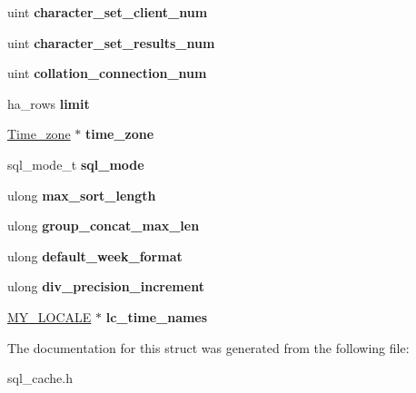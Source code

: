 \begin{DoxyCompactItemize}
uint {\bfseries character\+\_\+set\+\_\+client\+\_\+num}
\item 
\mbox{\label{structQuery__cache__query__flags_ab671ce68c180eccbe8e835b27793b6a7}} 
uint {\bfseries character\+\_\+set\+\_\+results\+\_\+num}
\item 
\mbox{\label{structQuery__cache__query__flags_a58ee0e73edc0ec68bd747c039bace83c}} 
uint {\bfseries collation\+\_\+connection\+\_\+num}
\item 
\mbox{\label{structQuery__cache__query__flags_a78aa1e3816d2ab3007bbca40bfe2ab32}} 
ha\+\_\+rows {\bfseries limit}
\item 
\mbox{\label{structQuery__cache__query__flags_ac22e3829a937200a9dec851df600ebe4}} 
\mbox{\hyperlink{classTime__zone}{Time\+\_\+zone}} $\ast$ {\bfseries time\+\_\+zone}
\item 
\mbox{\label{structQuery__cache__query__flags_ad0cf5de25b925a8674c63024fab42f58}} 
sql\+\_\+mode\+\_\+t {\bfseries sql\+\_\+mode}
\item 
\mbox{\label{structQuery__cache__query__flags_a2a4472b412877382c0b05fd47a296e02}} 
ulong {\bfseries max\+\_\+sort\+\_\+length}
\item 
\mbox{\label{structQuery__cache__query__flags_aafbc2788e88328815970e862128a9006}} 
ulong {\bfseries group\+\_\+concat\+\_\+max\+\_\+len}
\item 
\mbox{\label{structQuery__cache__query__flags_ae13a68dc3692561a68e771c6684996aa}} 
ulong {\bfseries default\+\_\+week\+\_\+format}
\item 
\mbox{\label{structQuery__cache__query__flags_ad12decab9d1e9872914d692d16204150}} 
ulong {\bfseries div\+\_\+precision\+\_\+increment}
\item 
\mbox{\label{structQuery__cache__query__flags_a5931104dafd9bd274a704d8c77b3dc79}} 
\mbox{\hyperlink{classMY__LOCALE}{M\+Y\+\_\+\+L\+O\+C\+A\+LE}} $\ast$ {\bfseries lc\+\_\+time\+\_\+names}
\end{DoxyCompactItemize}


The documentation for this struct was generated from the following file\+:\begin{DoxyCompactItemize}
\item 
sql\+\_\+cache.\+h\end{DoxyCompactItemize}
